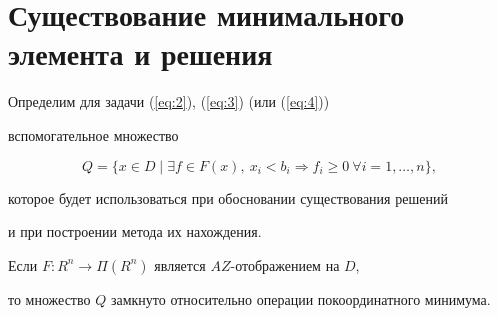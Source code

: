 \section{Существование минимального элемента и решения}





Определим для задачи (\ref{eq:2}), (\ref{eq:3}) (или (\ref{eq:4}))


вспомогательное множество


\begin{equation}\label{eq:6}


Q=\{ x \in D \mid \exists f \in F(x), \ x_i<b_i \Rightarrow f_i \ge 0


\ \forall i = 1,\dotsc,n\},


\end{equation}


которое будет использоваться при обосновании существования решений


и при построении метода их нахождения.











\begin{lems}\label{lem:1}


Если $F: R^n \to \Pi (R^n)$ является $AZ$-отображением на $D$,


то множество $Q$ замкнуто относительно операции покоординатного минимума.


\end{lems}








